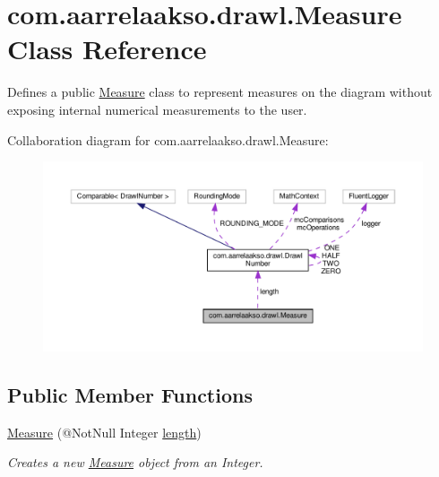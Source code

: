 \hypertarget{classcom_1_1aarrelaakso_1_1drawl_1_1_measure}{}\section{com.\+aarrelaakso.\+drawl.\+Measure Class Reference}
\label{classcom_1_1aarrelaakso_1_1drawl_1_1_measure}


Defines a public \hyperlink{classcom_1_1aarrelaakso_1_1drawl_1_1_measure}{Measure} class to represent measures on the diagram without exposing internal numerical measurements to the user.  




Collaboration diagram for com.\+aarrelaakso.\+drawl.\+Measure\+:\nopagebreak
\begin{figure}[H]
\begin{center}
\leavevmode
\includegraphics[width=350pt]{d5/ddb/classcom_1_1aarrelaakso_1_1drawl_1_1_measure__coll__graph}
\end{center}
\end{figure}
\subsection*{Public Member Functions}
\begin{DoxyCompactItemize}
\item 
\hyperlink{classcom_1_1aarrelaakso_1_1drawl_1_1_measure_a1eb630b258eb8f181f7e0c96d2df7951}{Measure} (@Not\+Null Integer \hyperlink{classcom_1_1aarrelaakso_1_1drawl_1_1_measure_a13ac55ae968c5e7bed4b3305370d94c5}{length})
\begin{DoxyCompactList}\small\item\em Creates a new \hyperlink{classcom_1_1aarrelaakso_1_1drawl_1_1_measure}{Measure} object from an Integer. \end{DoxyCompactList}\end{DoxyCompactItemize}
